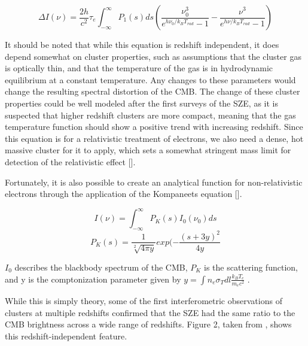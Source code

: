 \documentclass[manuscript]{aastex}
\begin{document}
\begin{equation}
\Delta I(\nu) = \frac{2h}{c^{2}}\tau_{e} \int_{-\infty}^{\infty} P_{1}(s) ds (\frac{\nu_{0}^{3}}{e^{h\nu_{0}/k_{B}T_{rad}}-1}  - \frac{\nu^{3}}{e^{h\nu/k_{B}T_{rad}}-1})
\end{equation}

It should be noted that while this equation is redshift independent, it does depend somewhat on cluster properties, such as assumptions that the cluster gas is optically thin, and that the temperature of the gas is in hydrodynamic equilibrium at a constant temperature. Any changes to these parameters would change the resulting spectral distortion of the CMB. The change of these cluster properties could be well modeled after the first surveys of the SZE, as it is suspected that higher redshift clusters are more compact, meaning that the gas temperature function should show a positive trend with increasing redshift. Since this equation is for a relativistic treatment of electrons, we also need a dense, hot massive cluster for it to apply, which sets a somewhat stringent mass limit for detection of the relativistic effect [\cite{Carlstrom2002}].

Fortunately, it is also possible to create an analytical function for non-relativistic electrons through the application of the Kompaneets equation [\cite{Birkinshaw1999}].

\begin{equation}
I(\nu) = \int_{-\infty}^{\infty} P_{K}(s) I_{0}(\nu_{0}) ds
\end{equation}
\begin{equation}
P_{K}(s) = \frac{1}{\sqrt[2]{4 \pi y}} exp(-\frac{(s + 3y)^{2}}{4y}
\end{equation}

\(I_{0}\) describes the blackbody spectrum of the CMB, \(P_{K}\) is the scattering function, and y is the comptonization parameter given by \(y = \int   n_{e}   \sigma_{T}   dl   \frac{k_{B}T_{e}}{m_{e}c^{2}}\) .

While this is simply theory, some of the first interferometric observations of clusters at multiple redshifts confirmed that the SZE had the same ratio to the CMB brightness across a wide range of redshifts. Figure 2, taken from \cite{Carlstrom2002}, shows this redshift-independent feature.
\end{document}
